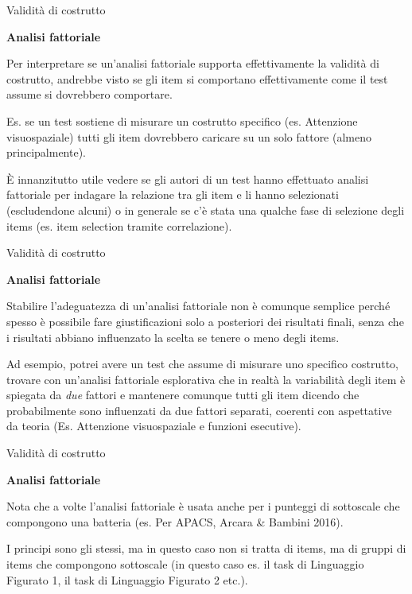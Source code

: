 \documentclass[
  ignorenonframetext,
  aspectratio=169,
]{beamer}
\begin{document}
\begin{frame}{Validità di costrutto}
\label{validituxe0-di-costrutto-10}
\begin{center}
  \textbf{Analisi fattoriale}
\end{center}
\vspace{1em}

Per interpretare se un'analisi fattoriale supporta effettivamente la
validità di costrutto, andrebbe visto se gli item si comportano
effettivamente come il test assume si dovrebbero comportare.

Es. se un test sostiene di misurare un costrutto specifico (es.
Attenzione visuospaziale) tutti gli item dovrebbero caricare su un solo
fattore (almeno principalmente).

È innanzitutto utile vedere se gli autori di un test hanno effettuato
analisi fattoriale per indagare la relazione tra gli item e li hanno
selezionati (escludendone alcuni) o in generale se c'è stata una qualche
fase di selezione degli items (es. item selection tramite correlazione).
\end{frame}

\begin{frame}{Validità di costrutto}
\label{validituxe0-di-costrutto-11}
\begin{center}
  \textbf{Analisi fattoriale}
\end{center}
\vspace{1em}

Stabilire l'adeguatezza di un'analisi fattoriale non è comunque semplice
perché spesso è possibile fare giustificazioni solo a posteriori dei
risultati finali, senza che i risultati abbiano influenzato la scelta se
tenere o meno degli items.

Ad esempio, potrei avere un test che assume di misurare uno specifico
costrutto, trovare con un'analisi fattoriale esplorativa che in realtà
la variabilità degli item è spiegata da \emph{due} fattori e mantenere
comunque tutti gli item dicendo che probabilmente sono influenzati da
due fattori separati, coerenti con aspettative da teoria (Es. Attenzione
visuospaziale e funzioni esecutive).
\end{frame}

\begin{frame}{Validità di costrutto}
\label{validituxe0-di-costrutto-12}
\begin{center}
  \textbf{Analisi fattoriale}
\end{center}
\vspace{2em}

Nota che a volte l'analisi fattoriale è usata anche per i punteggi di
sottoscale che compongono una batteria (es. Per APACS, Arcara \& Bambini
2016).

I principi sono gli stessi, ma in questo caso non si tratta di items, ma
di gruppi di items che compongono sottoscale (in questo caso es. il task
di Linguaggio Figurato 1, il task di Linguaggio Figurato 2 etc.).
\end{frame}
\end{document}
